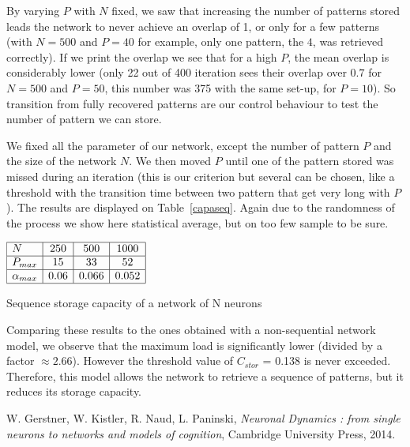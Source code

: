 By varying $P$ with $N$ fixed, we saw that increasing the number of patterns stored leads the network
to never achieve an overlap of 1, or only for a few patterns (with $N = 500$ and $P = 40$ for example, only one pattern, the $4$,
was retrieved correctly). If we print the overlap we see that for a high $P$, the mean overlap is considerably lower (only 22 out of 400
iteration sees their overlap over $0.7$ for $N = 500$ and $P = 50$, this number was 375 with the same set-up, for $P = 10$). So transition
from fully recovered patterns are our control behaviour to test the number of pattern we can store. 

We fixed all the parameter of our network, except the number of pattern $P$ and the size of the
network $N$. We then moved $P$ until one of the pattern stored was missed during an iteration (this is our criterion
but several can be chosen, like a threshold with the transition time between two pattern that get very long
with $P$). The results are displayed on Table~\ref{capaseq}. Again due to the randomness of the process
we show here statistical average, but on too few sample to be sure. 

\begin{table}[h]\label{capaseq}
\begin{center}
\begin{math}
    \begin{array}{|l|c|c|c|}
    \hline
    N & 250 & 500 & 1000 \\ \hline
    P_{max} & 15 & 33 & 52 \\ \hline
    \alpha_{max}& 0.06 & 0.066 & 0.052\\ \hline
    \end{array}
\end{math}
\end{center}
\caption{Sequence storage capacity  of a network of N neurons}
\end{table}
Comparing these results to the ones obtained with a non-sequential network model, we observe that the maximum load is significantly lower (divided by a factor $\approx 2.66$). However the threshold value of  $C_{stor}$ = 0.138 is never exceeded. Therefore, this model allows the network to retrieve a sequence of patterns, but it reduces its storage capacity. 


\begin{thebibliography}{}
 W. Gerstner, W. Kistler, R. Naud, L. Paninski, \textit{Neuronal Dynamics : from single neurons to networks and models of cognition}, Cambridge University Press, 2014.
\end{thebibliography}

